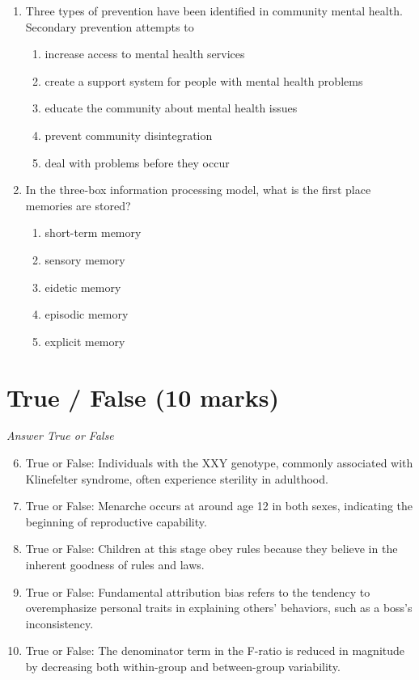 \documentclass[12pt]{article}
\begin{document}
\begin{enumerate}[label=\arabic*.]
\begin{enumerate}[label=(\alph*)]
\end{enumerate}
\item Three types of prevention have been identified in community mental health. Secondary prevention attempts to
\begin{enumerate}[label=(\alph*)]
    \item increase access to mental health services
    \item create a support system for people with mental health problems
    \item educate the community about mental health issues
    \item prevent community disintegration
    \item deal with problems before they occur
\end{enumerate}
\item In the three-box information processing model, what is the first place memories are stored?
\begin{enumerate}[label=(\alph*)]
    \item short-term memory
    \item sensory memory
    \item eidetic memory
    \item episodic memory
    \item explicit memory
\end{enumerate}
\end{enumerate}

\section*{True / False (10 marks)}
\textit{Answer True or False}
\begin{enumerate}[label=\arabic*.]
\setcounter{enumi}{5}
\item True or False: Individuals with the XXY genotype, commonly associated with Klinefelter syndrome, often experience sterility in adulthood.
\item True or False: Menarche occurs at around age 12 in both sexes, indicating the beginning of reproductive capability.
\item True or False: Children at this stage obey rules because they believe in the inherent goodness of rules and laws.
\item True or False: Fundamental attribution bias refers to the tendency to overemphasize personal traits in explaining others' behaviors, such as a boss's inconsistency.
\item True or False: The denominator term in the F-ratio is reduced in magnitude by decreasing both within-group and between-group variability.
\end{enumerate}
\end{document}
